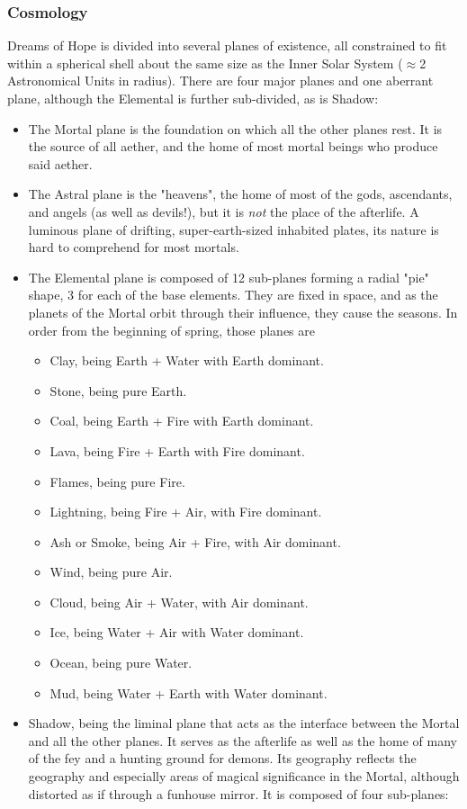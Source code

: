 \subsubsection{Cosmology}
Dreams of Hope is divided into several planes of existence, all constrained to fit within a spherical shell about the same size as the Inner Solar System ($\approx$2 Astronomical Units in radius). There are four major planes and one aberrant plane, although the Elemental is further sub-divided, as is Shadow:
\begin{itemize}
	\item The Mortal plane is the foundation on which all the other planes rest. It is the source of all aether, and the home of most mortal beings who produce said aether.
	\item The Astral plane is the "heavens", the home of most of the gods, ascendants, and angels (as well as devils!), but it is \textit{not} the place of the afterlife. A luminous plane of drifting, super-earth-sized inhabited plates, its nature is hard to comprehend for most mortals.
	\item The Elemental plane is composed of 12 sub-planes forming a radial "pie" shape, 3 for each of the base elements. They are fixed in space, and as the planets of the Mortal orbit through their influence, they cause the seasons. In order from the beginning of spring, those planes are
	\begin{itemize}
		\item Clay, being Earth + Water with Earth dominant.
		\item Stone, being pure Earth.
		\item Coal, being Earth + Fire with Earth dominant.
		\item Lava, being Fire + Earth with Fire dominant.
		\item Flames, being pure Fire.
		\item Lightning, being Fire + Air, with Fire dominant.
		\item Ash or Smoke, being Air + Fire, with Air dominant.
		\item Wind, being pure Air.
		\item Cloud, being Air + Water, with Air dominant.
		\item Ice, being Water + Air with Water dominant.
		\item Ocean, being pure Water.
		\item Mud, being Water + Earth with Water dominant.
	\end{itemize}
	\item Shadow, being the liminal plane that acts as the interface between the Mortal and all the other planes. It serves as the afterlife as well as the home of many of the fey and a hunting ground for demons. Its geography reflects the geography and especially areas of magical significance in the Mortal, although distorted as if through a funhouse mirror. It is composed of four sub-planes:

\end{itemize}
